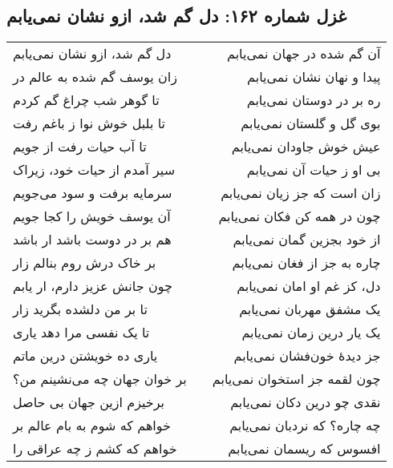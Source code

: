 \begin{center}
\section*{غزل شماره ۱۶۲: دل گم شد، ازو نشان نمی‌یابم}
\label{sec:162}
\begin{longtable}{l p{0.5cm} r}
دل گم شد، ازو نشان نمی‌یابم
&&
آن گم شده در جهان نمی‌یابم
\\
زان یوسف گم شده به عالم در
&&
پیدا و نهان نشان نمی‌یابم
\\
تا گوهر شب چراغ گم کردم
&&
ره بر در دوستان نمی‌یابم
\\
تا بلبل خوش نوا ز باغم رفت
&&
بوی گل و گلستان نمی‌یابم
\\
تا آب حیات رفت از جویم
&&
عیش خوش جاودان نمی‌یابم
\\
سیر آمدم از حیات خود، زیراک
&&
بی او ز حیات آن نمی‌یابم
\\
سرمایه برفت و سود می‌جویم
&&
زان است که جز زیان نمی‌یابم
\\
آن یوسف خویش را کجا جویم
&&
چون در همه کن فکان نمی‌یابم
\\
هم بر در دوست باشد ار باشد
&&
از خود بجزین گمان نمی‌یابم
\\
بر خاک درش روم بنالم زار
&&
چاره به جز از فغان نمی‌یابم
\\
چون جانش عزیز دارم، ار یابم
&&
دل، کز غم او امان نمی‌یابم
\\
تا بر من دلشده بگرید زار
&&
یک مشفق مهربان نمی‌یابم
\\
تا یک نفسی مرا دهد یاری
&&
یک یار درین زمان نمی‌یابم
\\
یاری ده خویشتن درین ماتم
&&
جز دیدهٔ خون‌فشان نمی‌یابم
\\
بر خوان جهان چه می‌نشینم من؟
&&
چون لقمه جز استخوان نمی‌یابم
\\
برخیزم ازین جهان بی حاصل
&&
نقدی چو درین دکان نمی‌یابم
\\
خواهم که شوم به بام عالم بر
&&
چه چاره؟ که نردبان نمی‌یابم
\\
خواهم که کشم ز چه عراقی را
&&
افسوس که ریسمان نمی‌یابم
\\
\end{longtable}
\end{center}
